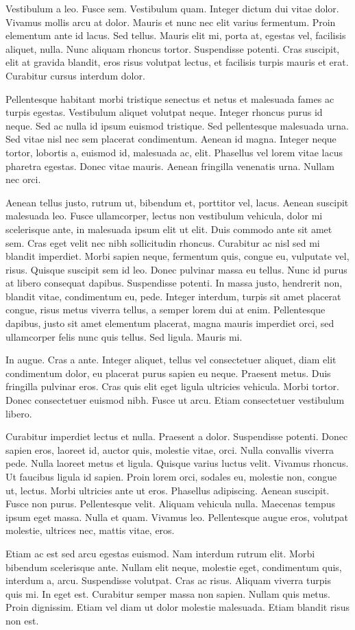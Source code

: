 Vestibulum a leo. Fusce sem. Vestibulum quam. Integer dictum dui vitae dolor. Vivamus mollis arcu at dolor. Mauris et nunc nec elit varius fermentum. Proin elementum ante id lacus. Sed tellus. Mauris elit mi, porta at, egestas vel, facilisis aliquet, nulla. Nunc aliquam rhoncus tortor. Suspendisse potenti. Cras suscipit, elit at gravida blandit, eros risus volutpat lectus, et facilisis turpis mauris et erat. Curabitur cursus interdum dolor.

Pellentesque habitant morbi tristique senectus et netus et malesuada fames ac turpis egestas. Vestibulum aliquet volutpat neque. Integer rhoncus purus id neque. Sed ac nulla id ipsum euismod tristique. Sed pellentesque malesuada urna. Sed vitae nisl nec sem placerat condimentum. Aenean id magna. Integer neque tortor, lobortis a, euismod id, malesuada ac, elit. Phasellus vel lorem vitae lacus pharetra egestas. Donec vitae mauris. Aenean fringilla venenatis urna. Nullam nec orci.

Aenean tellus justo, rutrum ut, bibendum et, porttitor vel, lacus. Aenean suscipit malesuada leo. Fusce ullamcorper, lectus non vestibulum vehicula, dolor mi scelerisque ante, in malesuada ipsum elit ut elit. Duis commodo ante sit amet sem. Cras eget velit nec nibh sollicitudin rhoncus. Curabitur ac nisl sed mi blandit imperdiet. Morbi sapien neque, fermentum quis, congue eu, vulputate vel, risus. Quisque suscipit sem id leo. Donec pulvinar massa eu tellus. Nunc id purus at libero consequat dapibus. Suspendisse potenti. In massa justo, hendrerit non, blandit vitae, condimentum eu, pede. Integer interdum, turpis sit amet placerat congue, risus metus viverra tellus, a semper lorem dui at enim. Pellentesque dapibus, justo sit amet elementum placerat, magna mauris imperdiet orci, sed ullamcorper felis nunc quis tellus. Sed ligula. Mauris mi.

In augue. Cras a ante. Integer aliquet, tellus vel consectetuer aliquet, diam elit condimentum dolor, eu placerat purus sapien eu neque. Praesent metus. Duis fringilla pulvinar eros. Cras quis elit eget ligula ultricies vehicula. Morbi tortor. Donec consectetuer euismod nibh. Fusce ut arcu. Etiam consectetuer vestibulum libero.

Curabitur imperdiet lectus et nulla. Praesent a dolor. Suspendisse potenti. Donec sapien eros, laoreet id, auctor quis, molestie vitae, orci. Nulla convallis viverra pede. Nulla laoreet metus et ligula. Quisque varius luctus velit. Vivamus rhoncus. Ut faucibus ligula id sapien. Proin lorem orci, sodales eu, molestie non, congue ut, lectus. Morbi ultricies ante ut eros. Phasellus adipiscing. Aenean suscipit. Fusce non purus. Pellentesque velit. Aliquam vehicula nulla. Maecenas tempus ipsum eget massa. Nulla et quam. Vivamus leo. Pellentesque augue eros, volutpat molestie, ultrices nec, mattis vitae, eros.

Etiam ac est sed arcu egestas euismod. Nam interdum rutrum elit. Morbi bibendum scelerisque ante. Nullam elit neque, molestie eget, condimentum quis, interdum a, arcu. Suspendisse volutpat. Cras ac risus. Aliquam viverra turpis quis mi. In eget est. Curabitur semper massa non sapien. Nullam quis metus. Proin dignissim. Etiam vel diam ut dolor molestie malesuada. Etiam blandit risus non est.
